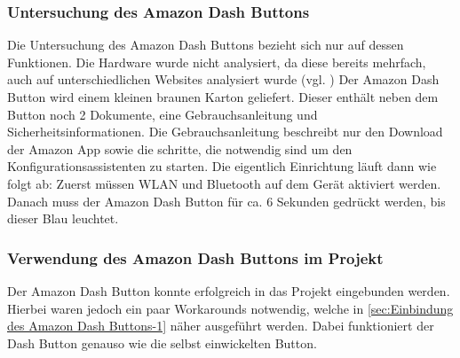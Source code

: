 \subsubsection{Untersuchung des Amazon Dash Buttons}
\label{sec:Untersuchung des Amazon Dash Buttons}
Die Untersuchung des Amazon Dash Buttons bezieht sich nur auf dessen Funktionen.
Die Hardware wurde nicht analysiert, da diese bereits mehrfach, auch auf unterschiedlichen Websites analysiert wurde (vgl. \cite{.17.05.2017}\cite{.17.05.2017b})
Der Amazon Dash Button wird einem kleinen braunen Karton geliefert.
Dieser enthält neben dem Button noch 2 Dokumente, eine Gebrauchsanleitung und Sicherheitsinformationen.
Die Gebrauchsanleitung beschreibt nur den Download der Amazon App sowie die schritte, die notwendig sind um den Konfigurationsassistenten zu starten.
Die eigentlich Einrichtung läuft dann wie folgt ab:
Zuerst müssen WLAN und Bluetooth auf dem Gerät aktiviert werden.
Danach muss der Amazon Dash Button für ca. 6 Sekunden gedrückt werden, bis dieser Blau leuchtet.

\subsubsection{Verwendung des Amazon Dash Buttons im Projekt}
\label{sec:Verwendung des Amazon Dash Buttons im Projekt}
Der Amazon Dash Button konnte erfolgreich in das Projekt eingebunden werden. Hierbei waren jedoch ein paar Workarounds notwendig, welche in \ref{sec:Einbindung des Amazon Dash Buttons-1} näher ausgeführt werden. Dabei funktioniert der Dash Button genauso wie die selbst einwickelten Button.